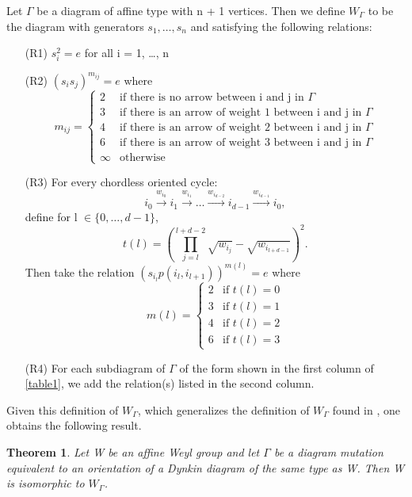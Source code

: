 \documentclass[11pt]{amsart}
\newtheorem{thm}{Theorem}[section]
\theoremstyle{definition}
\begin{document}
\begin{def}\cite[Definition 4.1]{FT13}
Let $\Gamma$ be a diagram of affine type with n + 1 vertices. Then we define $W_{\Gamma}$ to be the diagram with generators $s_{1}, \dots, s_{n}$ and satisfying the following relations:
\begin{enumerate}
\item[(R1)] $s_{i}^{2} = e$ for all i = 1, \dots, n
\item[(R2)] $(s_{i}s_{j})^{m_{ij}} = e$ where 
$$m_{ij} = 
\begin{cases}
2 &\text{if there is no arrow between i and j in $\Gamma$} \\
3 &\text{if there is an arrow of weight 1 between i and j in $\Gamma$} \\
4 &\text{if there is an arrow of weight 2 between i and j in $\Gamma$} \\
6 &\text{if there is an arrow of weight 3 between i and j in $\Gamma$} \\
\infty &\text{otherwise}
\end{cases}$$
\item[(R3)] For every chordless oriented cycle:
$$i_{0} \stackrel{w_{i_{0}}}{\longrightarrow} i_{1} \stackrel{w_{i_{1}}}{\longrightarrow} \dots \stackrel{w_{i_{d-2}}}{\longrightarrow} i_{d-1} \stackrel{w_{i_{d-1}}}{\longrightarrow} i_{0},$$
define for l $\in \{0, \dots, d-1\}$, 
$$t(l) = (\prod_{j=l}^{l+d-2}{\sqrt{w_{i_{j}}}} - \sqrt{w_{i_{l+d-1}}})^{2}.$$
Then take the relation $(s_{i_{l}}p(i_{l}, i_{l+1}))^{m(l)} = e$ where
$$m(l) =
\begin{cases}
2 &\text{if $t(l)=0$} \\
3 &\text{if $t(l)=1$} \\
4 &\text{if $t(l)=2$} \\
6 &\text{if $t(l)=3$}
\end{cases}$$
\item[(R4)] For each subdiagram of $\Gamma$ of the form shown in the first column of \ref{table1}, we add the relation(s) listed in the second column.
\end{enumerate}
\end{def}

Given this definition of $W_{\Gamma}$, which generalizes the definition of $W_{\Gamma}$ found in \cite{BM13}, one obtains the following result.

\begin{thm} \cite[Theorem 4.6]{FT13}
Let W be an affine Weyl group and let $\Gamma$ be a diagram mutation equivalent to an orientation of a Dynkin diagram of the same type as W. Then W is isomorphic to $W_{\Gamma}$.
\end{thm}
\end{document}

